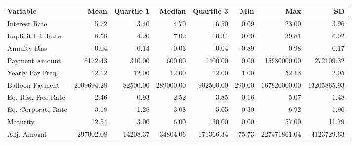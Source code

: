 \begin{tabular}{lrrrrrrr}
  \hline
Variable & Mean & Quartile 1 & Median & Quartile 3 & Min & Max & SD \\ 
  \hline
Interest Rate & 5.72 & 3.40 & 4.70 & 6.50 & 0.09 & 23.00 & 3.96 \\ 
  Implicit Int. Rate & 8.58 & 4.20 & 7.02 & 10.34 & 0.00 & 39.81 & 6.92 \\ 
  Annuity Bias & -0.04 & -0.14 & -0.03 & 0.04 & -0.89 & 0.98 & 0.17 \\ 
  Payment Amount & 8172.43 & 310.00 & 600.00 & 1400.00 & 0.00 & 15980000.00 & 272109.32 \\ 
  Yearly Pay Freq. & 12.12 & 12.00 & 12.00 & 12.00 & 1.00 & 52.18 & 2.05 \\ 
  Balloon Payment & 2009694.28 & 82500.00 & 289000.00 & 902500.00 & 290.00 & 167820000.00 & 13205865.93 \\ 
  Eq. Risk Free Rate & 2.46 & 0.93 & 2.52 & 3.85 & 0.16 & 5.07 & 1.48 \\ 
  Eq. Corporate Rate & 3.18 & 1.28 & 3.08 & 5.05 & 0.30 & 6.92 & 1.90 \\ 
  Maturity & 12.54 & 3.00 & 6.00 & 30.00 & 0.00 & 57.00 & 11.79 \\ 
  Adj. Amount & 297002.08 & 14208.37 & 34804.06 & 171366.34 & 75.73 & 227471861.04 & 4123729.63 \\ 
   \hline
\end{tabular}
